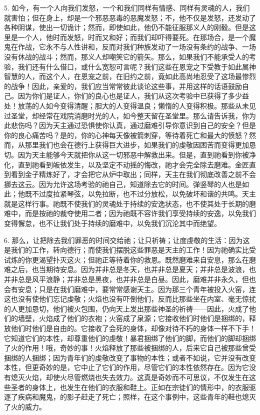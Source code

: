 5. 如今，有一个人向我们发怒，一个和我们同样有情感、同样有灵魂的人，我们就害怕；但在身上，却是一个邪恶恶毒的恶魔发怒；不，他不仅是发怒，还发动了各种阴谋，使出一切诡计；然而，即使如此，他仍不能征服那义人的刚毅。但是这里是一个人，他时而发怒，时而又和好；而我们却吓得要死。在那场合，是一个魔鬼在作战，它永不与人性讲和，反而对我们种族发动了一场没有条约的战争、一场没有休战的战斗；然而，那义人却嘲笑它的箭矢。那么，如果我们不能承受人的考验，我们还有什么借口，或什么宽恕可言呢？我们这些在恩宠之下受教于如此属神智慧的人，而这个人，在恩宠之前，在旧约之前，竟如此高尚地忍受了这场最惨烈的战争！因此，亲爱的，我们应当常常彼此谈论这些事，并用这样的话语鼓励自己。因为你们是证人，你们的良心也是证人，我们从这次考验中已获得了多少益处！放荡的人如今变得清醒；胆大的人变得温良；懒惰的人变得积极。那些从未见过圣堂，却经常在戏院消磨时光的人，如今整天留在圣堂里。那么请告诉我，你为此悲伤吗？因为天主通过恐惧使你认真，通过磨难引导你意识到自己的安全？但是你的良心痛苦吗？是的，你的心神每天像被箭刺穿，等待着死亡和最大的愤怒？然而，从那里我们也会在德行上获得巨大进步，如果我们的虔敬因困苦而变得更加恳切。因为天主能够今天就把你从这一切邪恶中解救出来。但是，直到祂看到你被净化，直到祂看到皈依发生，以及坚定不动摇的悔改，祂才会完全除去磨难。金匠直到看到金子精炼好了，才会把它从炉中取出；同样，天主在我们彻底改善之前不会挪去这云。因为允许这场考验的祂自己，知道除去它的时间。弹竖琴的人也是如此；他既不过度拉紧琴弦，以免拉断，也不过分放松，以免破坏和谐的共鸣。天主就是这样行事。祂既不使我们的灵魂处于持续的安逸状态，也不使其处于长期的磨难中，而是按祂的裁夺使用二者；因为祂既不容许我们享受持续的安逸，以免我们变得懈怠，也不让我们处于持续的磨难中，以免我们沉沦其中而绝望。\par

6. 那么，让把除去我们罪恶的时间交给祂；让只祈祷；让度虔敬的生活：因为这是我们的工作，转向德行；而使我们摆脱这些罪恶是天主的工作！因为祂确实比受试炼的你更渴望扑灭这火；但祂正等待着你的救恩。既然磨难来自安息，那么在磨难之后，也当期待安息。因为并非总是冬天，也并非总是夏天；并非总是波浪，也并非总是风平浪静；并非总是黑夜，也并非总是白昼。因此，磨难并非永久，但也会有安息；只是在我们磨难中，要常常感谢天主。因为那三个青年被投入火窑，连这也没有使他们忘记虔敬；火焰也没有吓倒他们，反而比那些坐在内室、毫无惊扰的人更加恳切，他们被火包围，仍向天上发出那些神圣的祈祷——因此，火成了他们的墙壁，火焰成了他们的衣袍；火窑成了泉源；它接收他们时他们是捆绑的，释放他们时他们是自由的。它接收了会死的身体，却像对待不朽的身体一样不下手！它知道它们的本性，却尊重他们的虔敬！暴君捆绑了他们的脚，而他们的脚却捆绑了火的作用！哦，奇妙的事！火焰释放了那些被捆绑的人，后来它自己被那些曾受捆绑的人捆绑；因为青年们的虔敬改变了事物的本性；或者不如说，它并没有改变本性，但更奇妙的是，它中止了它们的作用，尽管它们的本性依然存在。因为它没有熄灭火焰，却使火尽管燃烧也失去效力。这真是奇妙而不可思议，不仅发生在这些圣者的身体上，也发生在他们的衣服和鞋上。正如在宗徒们的情形中，的衣服驱逐了疾病和魔鬼，的影子赶走了死亡；照样，在这个事例中，这些青年的鞋也熄灭了火的威力。\par

